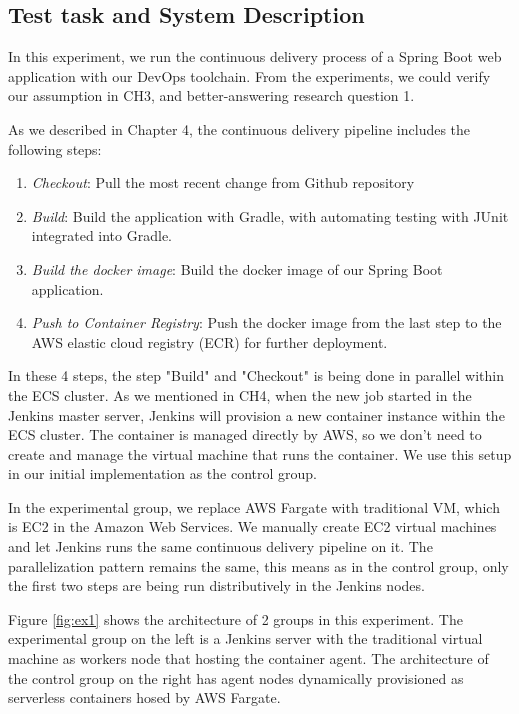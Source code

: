 \subsection{Test task and System Description}
In this experiment, we run the continuous delivery process of a Spring Boot web application with our DevOps toolchain. From the experiments, we could verify our assumption in CH3, and better-answering research question 1.
\par
As we described in Chapter 4, the continuous delivery pipeline includes the following steps:
\begin{enumerate}
    \item \textit{Checkout}: Pull the most recent change from Github repository
    \item \textit{Build}: Build the application with Gradle, with automating testing with JUnit integrated into Gradle.
    \item \textit{Build the docker image}: Build the docker image of our Spring Boot application.
    \item \textit{Push to Container Registry}: Push the docker image from the last step to the AWS elastic cloud registry (ECR) for further deployment.
\end{enumerate}
\par
In these 4 steps, the step "Build" and "Checkout" is being done in parallel within the ECS cluster. As we mentioned in CH4, when the new job started in the Jenkins master server, Jenkins will provision a new container instance within the ECS cluster. The container is managed directly by AWS, so we don't need to create and manage the virtual machine that runs the container. We use this setup in our initial implementation as the control group.
\par
In the experimental group, we replace AWS Fargate with traditional VM, which is EC2 in the Amazon Web Services. We manually create EC2 virtual machines and let Jenkins runs the same continuous delivery pipeline on it. The parallelization pattern remains the same, this means as in the control group, only the first two steps are being run distributively in the Jenkins nodes.
\par
Figure \ref{fig:ex1} shows the architecture of 2 groups in this experiment. The experimental group on the left is a Jenkins server with the traditional virtual machine as workers node that hosting the container agent. The architecture of the control group on the right has agent nodes dynamically provisioned as serverless containers hosed by AWS Fargate.
